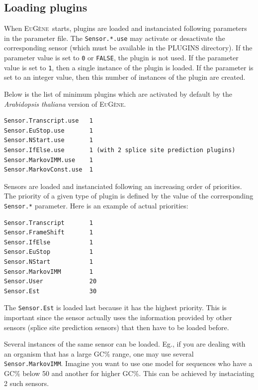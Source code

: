 \documentclass[a4paper,titlepage]{report}
\newcommand{\EuGene}{\textsc{EuG\`ene}}
\begin{document}
\subsection{Loading plugins}

When \EuGene\ starts, plugins are loaded and instanciated following
parameters in the parameter file. The \texttt{Sensor.*.use} may
activate or desactivate the corresponding sensor (which must be
available in the PLUGINS directory). If the parameter value is set to
\texttt{0} or \texttt{FALSE}, the plugin is not used. If the parameter
value is set to \texttt{1}, then a single instance of the plugin is
loaded. If the parameter is set to an integer value, then this number
of instances of the plugin are created.

Below is the list of minimum plugins which are activated by default by
the \emph{Arabidopsis thaliana} version of \EuGene.

\begin{Verbatim}
Sensor.Transcript.use   1
Sensor.EuStop.use       1
Sensor.NStart.use       1
Sensor.IfElse.use       1 (with 2 splice site prediction plugins)
Sensor.MarkovIMM.use    1
Sensor.MarkovConst.use  1
\end{Verbatim}  

Sensors are loaded and instanciated following an increasing order of
priorities. The priority of a given type of plugin is defined by the
value of the corresponding \texttt{Sensor.*} parameter. Here is an
example of actual priorities:

\begin{Verbatim}
Sensor.Transcript       1
Sensor.FrameShift       1
Sensor.IfElse           1
Sensor.EuStop           1       
Sensor.NStart           1       
Sensor.MarkovIMM        1 
Sensor.User             20
Sensor.Est              30         
\end{Verbatim}

The \texttt{Sensor.Est} is loaded last because it has the highest
priority.  This is important since the sensor actually uses the
information provided by other sensors (splice site prediction sensors)
that then have to be loaded before.

Several instances of the same sensor can be loaded. Eg., if you are
dealing with an organism that has a large GC\% range, one may use
several \texttt{Sensor.MarkovIMM}. Imagine you want to use one model
for sequences who have a GC\% below 50 and another for higher GC\%.
This can be achieved by instaciating 2 such sensors. 
\end{document}
